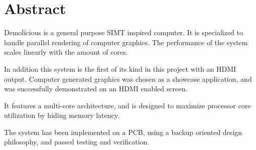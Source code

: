 \documentclass[../main/report.tex]{subfiles}
\begin{document}
\vspace*{\fill}
\chapter*{Abstract}
\label{sec:abstract}

Demolicious is a general purpose SIMT inspired computer.
It is specialized to handle parallel rendering of computer graphics.
The performance of the system scales linearly with the amount of cores.

In addition this system is the first of its kind in this project with an HDMI output.
Computer generated graphics was chosen as a showcase application,
and was successfully demonstrated on an HDMI enabled screen.

It features a multi-core architecture,
and is designed to maximize processor core utilization by hiding memory latency.

The system has been implemented on a PCB,
using a backup oriented design philosophy, and passed testing and verification.

\vspace*{\fill}
\end{document}
